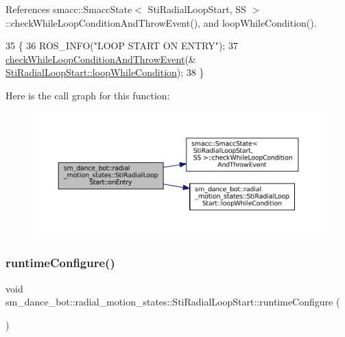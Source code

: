 References smacc\+::\+Smacc\+State$<$ Sti\+Radial\+Loop\+Start, S\+S $>$\+::check\+While\+Loop\+Condition\+And\+Throw\+Event(), and loop\+While\+Condition().


\begin{DoxyCode}
35   \{
36     ROS\_INFO(\textcolor{stringliteral}{"LOOP START ON ENTRY"});
37     \hyperlink{classsmacc_1_1SmaccState_a80082718f226bebedb589f0c4696001d}{checkWhileLoopConditionAndThrowEvent}(&
      \hyperlink{structsm__dance__bot_1_1radial__motion__states_1_1StiRadialLoopStart_a05d31b8062dae8eccc4d66ab21a0b720}{StiRadialLoopStart::loopWhileCondition});
38   \}
\end{DoxyCode}
Here is the call graph for this function\+:
\nopagebreak
\begin{figure}[H]
\begin{center}
\leavevmode
\includegraphics[width=350pt]{structsm__dance__bot_1_1radial__motion__states_1_1StiRadialLoopStart_a83662aeb4d86fe809ea02bc186e32415_cgraph}
\end{center}
\end{figure}
\mbox{\label{structsm__dance__bot_1_1radial__motion__states_1_1StiRadialLoopStart_a5d61523a7767c515712bd2ec23e27571}} 
\subsubsection{\texorpdfstring{runtime\+Configure()}{runtimeConfigure()}}
{\footnotesize\ttfamily void sm\+\_\+dance\+\_\+bot\+::radial\+\_\+motion\+\_\+states\+::\+Sti\+Radial\+Loop\+Start\+::runtime\+Configure (\begin{DoxyParamCaption}{ }\end{DoxyParamCaption})\hspace{0.3cm}{\ttfamily [inline]}}



